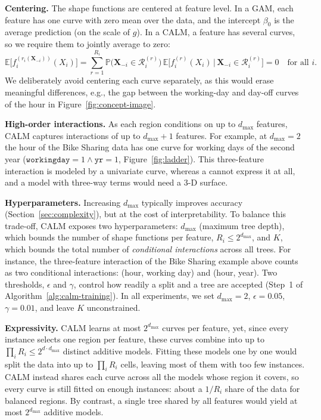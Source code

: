 \textbf{Centering.}
The shape functions are centered at feature level.
In a GAM, each feature has one curve with zero mean over the data, and the intercept $\beta_0$ is the average prediction (on the scale of $g$).
In a CALM, a feature has several curves, so we require them to jointly average to zero:
\begin{equation}
\label{eq:centering-main}
\mathbb{E}\big[f_i^{(r_i(\mathbf{X}_{-i}))}(X_i)\big]
= \sum_{r=1}^{R_i} \mathbb{P}\big(\mathbf{X}_{-i}\in\mathcal{R}_i^{(r)}\big)\,
\mathbb{E}\big[f_i^{(r)}(X_i)\,\big|\,\mathbf{X}_{-i}\in\mathcal{R}_i^{(r)}\big] = 0
\quad \text{for all } i.
\end{equation}
We deliberately avoid centering each curve separately, as this would erase meaningful differences, e.g., the gap between the working-day and day-off curves of the hour in Figure~\ref{fig:concept-image}.

\textbf{High-order interactions.}
As each region conditions on up to $d_{\max}$ features, CALM captures interactions of up to $d_{\max}+1$ features.
For example, at $d_{\max}=2$ the hour of the Bike Sharing data has one curve for working days of the second year ($\mathtt{workingday}=1 \wedge \mathtt{yr}=1$, Figure~\ref{fig:ladder}).
This three-feature interaction is modeled by a univariate curve, whereas a \gamm{} cannot express it at all, and a model with three-way terms would need a 3-D surface.

\textbf{Hyperparameters.}
Increasing $d_{\max}$ typically improves accuracy (Section~\ref{sec:complexity}), but at the cost of interpretability.
To balance this trade-off, CALM exposes two hyperparameters: $d_{\max}$ (maximum tree depth), which bounds the number of shape functions per feature, $R_i \leq 2^{d_{\max}}$, and $K$, which bounds the total number of \emph{conditional interactions} across all trees.
For instance, the three-feature interaction of the Bike Sharing example above counts as two conditional interactions: (hour, working day) and (hour, year).
Two thresholds, $\epsilon$ and $\gamma$, control how readily a split and a tree are accepted (Step~1 of Algorithm~\ref{alg:calm-training}).
In all experiments, we set $d_{\max} = 2$, $\epsilon = 0.05$, $\gamma = 0.01$, and leave $K$ unconstrained.

\textbf{Expressivity.}
CALM learns at most $2^{d_{\max}}$ curves per feature, yet, since every instance selects one region per feature, these curves combine into up to $\prod_{i} R_i \leq 2^{d\cdot d_{\max}}$ distinct additive models.
Fitting these models one by one would split the data into up to $\prod_{i} R_i$ cells, leaving most of them with too few instances. CALM instead shares each curve across all the models whose region it covers, so every curve is still fitted on enough instances: about a $1/R_i$ share of the data for balanced regions.
By contrast, a single tree shared by all features would yield at most $2^{d_{\max}}$ additive models.

